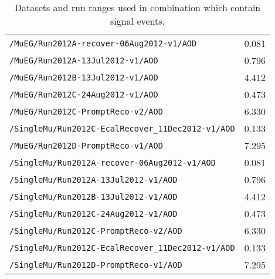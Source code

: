 \begin{table}[hbt]
\begin{center}
\begin{tabular}{lc}
\verb=/MuEG/Run2012A-recover-06Aug2012-v1/AOD=                              & 0.081            \\ 
\verb=/MuEG/Run2012A-13Jul2012-v1/AOD=                                                   & 0.796             \\ 
\verb=/MuEG/Run2012B-13Jul2012-v1/AOD=                                             & 4.412 \\ 
\verb=/MuEG/Run2012C-24Aug2012-v1/AOD=                                         & 0.473               \\ 
\verb=/MuEG/Run2012C-PromptReco-v2/AOD=                                         & 6.330              \\ 
\verb=/SingleMu/Run2012C-EcalRecover_11Dec2012-v1/AOD=           & 0.133\\
\verb=/MuEG/Run2012D-PromptReco-v1/AOD=                                      &  7.295 \\

\verb=/SingleMu/Run2012A-recover-06Aug2012-v1/AOD=                              & 0.081          \\ 
\verb=/SingleMu/Run2012A-13Jul2012-v1/AOD=                                           & 0.796                \\ 
\verb=/SingleMu/Run2012B-13Jul2012-v1/AOD=                                       & 4.412 \\ 
\verb=/SingleMu/Run2012C-24Aug2012-v1/AOD=                                        & 0.473               \\ 
\verb=/SingleMu/Run2012C-PromptReco-v2/AOD=                                      & 6.330                \\ 
\verb=/SingleMu/Run2012C-EcalRecover_11Dec2012-v1/AOD=           & 0.133 \\
\verb=/SingleMu/Run2012D-PromptReco-v1/AOD=                                     &  7.295 \\



 \hline\hline
\end{tabular}
\caption{\label{tab:DilDsets_lumi}Datasets and run ranges used in combination which contain signal events.}
\end{center}
\end{table}








